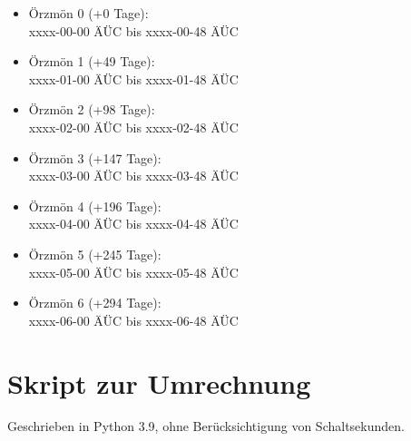 \begin{itemize}
\item Örzmön 0 (+0 Tage):\\ xxxx-00-00 ÄÜC bis xxxx-00-48 ÄÜC
\item Örzmön 1 (+49 Tage):\\ xxxx-01-00 ÄÜC bis xxxx-01-48 ÄÜC
\item Örzmön 2 (+98 Tage):\\ xxxx-02-00 ÄÜC bis xxxx-02-48 ÄÜC
\item Örzmön 3 (+147 Tage):\\ xxxx-03-00 ÄÜC bis xxxx-03-48 ÄÜC
\item Örzmön 4 (+196 Tage):\\ xxxx-04-00 ÄÜC bis xxxx-04-48 ÄÜC
\item Örzmön 5 (+245 Tage):\\ xxxx-05-00 ÄÜC bis xxxx-05-48 ÄÜC
\item Örzmön 6 (+294 Tage):\\ xxxx-06-00 ÄÜC bis xxxx-06-48 ÄÜC
\end{itemize}

\section{Skript zur Umrechnung}

Geschrieben in Python 3.9, ohne Berücksichtigung von Schaltsekunden.


